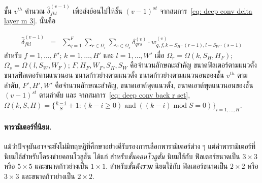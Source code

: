 ชั้น $v^{th}$ คำนวณ $\hat{\delta}_{fkl}^{(v-1)}$ เพื่อส่งย้อนไปให้ชั้น $(v-1)^{st}$ จากสมการ~\ref{eq: deep conv delta layer m 3}.
นั่นคือ

\begin{eqnarray}
\hat{\delta}_{fkl}^{(v-1)}
&=&
\sum_{q=1}^F \sum_{r \in \Omega_r} \sum_{s \in \Omega_s} \delta_{qrs}^{(v)}
\cdot
w_{q,f,k-S_H \cdot (r - 1),l-S_W \cdot (s - 1)}^{(v)}
\nonumber
\end{eqnarray} 
สำหรับ $f = 1, \ldots, F'$; $k = 1, \ldots, H'$ และ $l = 1, \ldots, W'$
เมื่อ $\Omega_r = \Omega(k, S_H, H_F)$; 
$\Omega_s = \Omega(l, S_W, W_F)$;
$F, H_F, W_F, S_H, S_W$ คือจำนวนลักษณะสำคัญ ขนาดฟิลเตอร์ตามแนวตั้ง ขนาดฟิลเตอร์ตามแนวนอน ขนาดก้าวย่างตามแนวตั้ง ขนาดก้าวย่างตามแนวนอนของชั้น $v^{th}$ ตามลำดับ,
$F', H', W'$ คือจำนวนลักษณะสำคัญ, ขนาดเอาต์พุตแนวตั้ง, ขนาดเอาต์พุตแนวนอนของชั้น $(v-1)^{st}$ ตามลำดับ
และ จากสมการ~\ref{eq: deep conv back r set},
$
\Omega(k, S, H) = \{ \frac{k - i}{S} + 1: (k - i \geq 0) \;\mathrm{and}\; \left( (k - i) \;\mathrm{mod}\; S = 0 \right) \}_{i = 1, \ldots, H}
$.

\paragraph{พารามิเตอร์ที่นิยม.}
แม้ว่าปัจจุบันอาจจะยังไม่มีทฤษฎีที่ศึกษาอย่างดีรับรองการเลือกพารามิเตอร์ต่าง ๆ
แต่ค่าพารามิเตอร์ที่นิยมใช้สำหรับโครงข่ายคอนโวลูชั่น ได้แก่
สำหรับ\textit{ชั้นคอนโวลูชั่น} นิยมใช้กับ 
ฟิลเตอร์ขนาดเป็น $3 \times 3$ หรือ $5 \times 5$
และขนาดก้าวย่างเป็น $1 \times 1$.
สำหรับ\textit{ชั้นดึงรวม} นิยมใช้กับ 
ฟิลเตอร์ขนาดเป็น $2 \times 2$ หรือ $3 \times 3$
และขนาดก้าวย่างเป็น $2 \times 2$.

